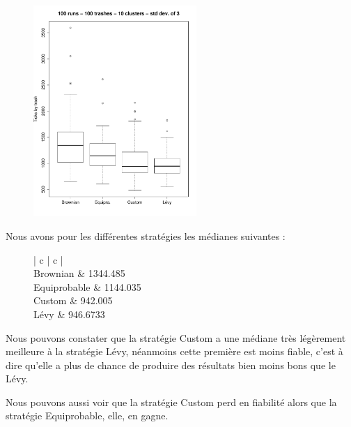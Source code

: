 

\begin{figure}[H]
	\begin{center}
		\includegraphics[height=8cm]{diagrams/100Tr10Clts_all.pdf}
		\caption{}
		\label{fig:100Trashes_10Clusters}
	\end{center}
\end{figure}

Nous avons pour les différentes stratégies les médianes suivantes :

\begin{figure}[H]
	\begin{center}
		\begin{tabular}{ | c | c | }
			\hline
			 \\
			\hline
			Brownian & 1344.485 \\
			Equiprobable & 1144.035 \\
			Custom & 942.005 \\
			Lévy & 946.6733 \\
			\hline
		\end{tabular}
	\end{center}
\end{figure}


Nous pouvons constater que la stratégie Custom a une médiane très
légèrement meilleure à la stratégie Lévy, néanmoins cette première
est moins fiable, c'est à dire qu'elle a plus de chance de produire
des résultats bien moins bons que le Lévy.

Nous pouvons aussi voir que la stratégie Custom perd en fiabilité
alors que la stratégie Equiprobable, elle, en gagne.